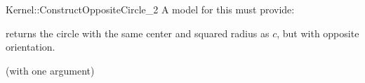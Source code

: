 \begin{ccRefFunctionObjectConcept}{Kernel::ConstructOppositeCircle_2}
A model for this must provide:


{ returns the circle with the same center and squared radius as
  $c$, but with opposite orientation.}

\ccRefines
{} (with one argument)

\ccSeeAlso
{}\\

\end{ccRefFunctionObjectConcept}
